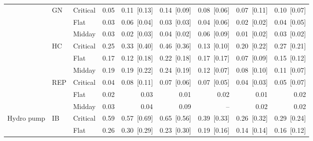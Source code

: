 \begin{tabular}{l l l r r r r r r }
 & GN & Critical & 0.05 & 0.11~{\color{seasoncol}\scriptsize[0.13]} & 0.14~{\color{seasoncol}\scriptsize[0.09]} & 0.08~{\color{seasoncol}\scriptsize[0.06]} & 0.07~{\color{seasoncol}\scriptsize[0.11]} & 0.10~{\color{seasoncol}\scriptsize[0.07]} \\
 &  & Flat & 0.03 & 0.06~{\color{seasoncol}\scriptsize[0.04]} & 0.03~{\color{seasoncol}\scriptsize[0.03]} & 0.04~{\color{seasoncol}\scriptsize[0.06]} & 0.02~{\color{seasoncol}\scriptsize[0.02]} & 0.04~{\color{seasoncol}\scriptsize[0.05]} \\
 &  & Midday & 0.03 & 0.02~{\color{seasoncol}\scriptsize[0.03]} & 0.04~{\color{seasoncol}\scriptsize[0.02]} & 0.06~{\color{seasoncol}\scriptsize[0.09]} & 0.01~{\color{seasoncol}\scriptsize[0.02]} & 0.03~{\color{seasoncol}\scriptsize[0.02]} \\
 & HC & Critical & 0.25 & 0.33~{\color{seasoncol}\scriptsize[0.40]} & 0.46~{\color{seasoncol}\scriptsize[0.36]} & 0.13~{\color{seasoncol}\scriptsize[0.10]} & 0.20~{\color{seasoncol}\scriptsize[0.22]} & 0.27~{\color{seasoncol}\scriptsize[0.21]} \\
 &  & Flat & 0.17 & 0.12~{\color{seasoncol}\scriptsize[0.18]} & 0.22~{\color{seasoncol}\scriptsize[0.18]} & 0.17~{\color{seasoncol}\scriptsize[0.17]} & 0.07~{\color{seasoncol}\scriptsize[0.09]} & 0.15~{\color{seasoncol}\scriptsize[0.12]} \\
 &  & Midday & 0.19 & 0.19~{\color{seasoncol}\scriptsize[0.22]} & 0.24~{\color{seasoncol}\scriptsize[0.19]} & 0.12~{\color{seasoncol}\scriptsize[0.07]} & 0.08~{\color{seasoncol}\scriptsize[0.10]} & 0.11~{\color{seasoncol}\scriptsize[0.07]} \\
 & REP & Critical & 0.04 & 0.08~{\color{seasoncol}\scriptsize[0.11]} & 0.07~{\color{seasoncol}\scriptsize[0.06]} & 0.07~{\color{seasoncol}\scriptsize[0.05]} & 0.04~{\color{seasoncol}\scriptsize[0.03]} & 0.05~{\color{seasoncol}\scriptsize[0.07]} \\
 &  & Flat & 0.02 & 0.03 & 0.01 & 0.02 & 0.01 & 0.02 \\
 &  & Midday & 0.03 & 0.04 & 0.09 & -- & 0.02 & 0.02 \\
\addlinespace
Hydro pump & IB & Critical & 0.59 & 0.57~{\color{seasoncol}\scriptsize[0.69]} & 0.65~{\color{seasoncol}\scriptsize[0.56]} & 0.39~{\color{seasoncol}\scriptsize[0.33]} & 0.26~{\color{seasoncol}\scriptsize[0.32]} & 0.29~{\color{seasoncol}\scriptsize[0.24]} \\
 &  & Flat & 0.26 & 0.30~{\color{seasoncol}\scriptsize[0.29]} & 0.23~{\color{seasoncol}\scriptsize[0.30]} & 0.19~{\color{seasoncol}\scriptsize[0.16]} & 0.14~{\color{seasoncol}\scriptsize[0.14]} & 0.16~{\color{seasoncol}\scriptsize[0.12]} \\

\end{tabular}
